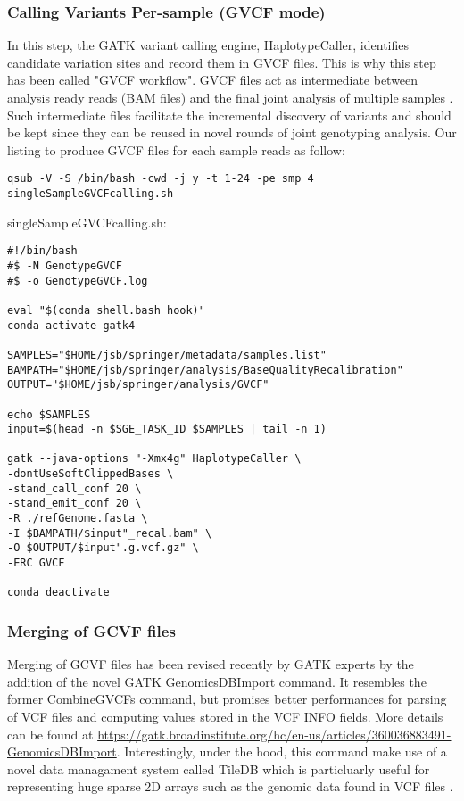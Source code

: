 \subsubsection{Calling Variants Per-sample (GVCF mode)}


In this step, the GATK variant calling engine, HaplotypeCaller, identifies candidate variation sites and record them in GVCF files. This is why this step has been called "GVCF workflow". GVCF files act as intermediate between analysis ready reads (BAM files) and the final joint analysis of multiple samples \cite{GATK_jointCalling_1}. Such intermediate files facilitate the incremental discovery of variants and should be kept since they can be reused in novel rounds of joint genotyping analysis. Our listing to produce GVCF files for each sample reads as follow:

\begin{verbatim}
qsub -V -S /bin/bash -cwd -j y -t 1-24 -pe smp 4  singleSampleGVCFcalling.sh
\end{verbatim}

singleSampleGVCFcalling.sh:

\begin{verbatim}
#!/bin/bash
#$ -N GenotypeGVCF
#$ -o GenotypeGVCF.log

eval "$(conda shell.bash hook)"
conda activate gatk4

SAMPLES="$HOME/jsb/springer/metadata/samples.list"
BAMPATH="$HOME/jsb/springer/analysis/BaseQualityRecalibration"
OUTPUT="$HOME/jsb/springer/analysis/GVCF"

echo $SAMPLES
input=$(head -n $SGE_TASK_ID $SAMPLES | tail -n 1)

gatk --java-options "-Xmx4g" HaplotypeCaller \
‐dontUseSoftClippedBases \​
‐stand_call_conf 20 \
‐stand_emit_conf 20 \
-R ./refGenome.fasta \
-I $BAMPATH/$input"_recal.bam" \
-O $OUTPUT/$input".g.vcf.gz" \
-ERC GVCF

conda deactivate
\end{verbatim}



\subsubsection{Merging of GCVF files}

Merging of GCVF files has been revised recently by GATK experts by the addition of the novel GATK GenomicsDBImport command. It resembles the former CombineGVCFs command, but promises better performances for parsing of VCF files and computing values stored in the VCF INFO fields. More details can be found at \href{https://gatk.broadinstitute.org/hc/en-us/articles/360036883491-GenomicsDBImport}{https://gatk.broadinstitute.org/hc/en-us/articles/360036883491-GenomicsDBImport}. Interestingly, under the hood, this command make use of a novel data managament system called  TileDB which is particluarly useful for representing huge sparse 2D arrays such as the genomic data found in VCF files \cite{Papadopoulos2016}. 


